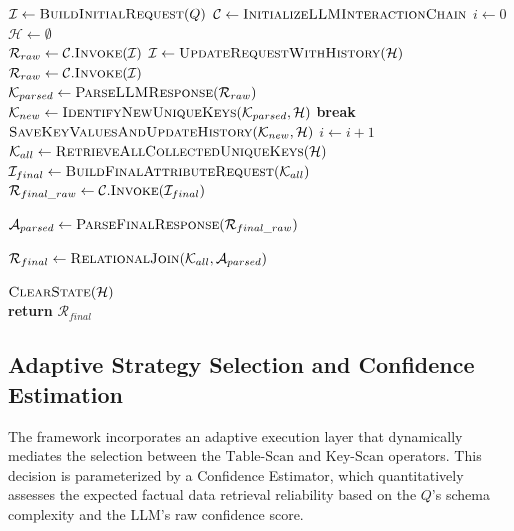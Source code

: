 \begin{algorithm}
\caption{Key-Scan Algorithm}
\label{alg:key_scan}
\begin{algorithmic}[1]
    \State $\mathcal{I} \gets \Call{BuildInitialRequest}{Q}$ 
    \State $\mathcal{C} \gets \Call{InitializeLLMInteractionChain}{}$
    \State $i \gets 0$
    \State $\mathcal{H} \gets \emptyset$ 
    \\
            \State $\mathcal{R}_{raw} \gets \mathcal{C}.\Call{Invoke}{\mathcal{I}}$
        \Else
            \State $\mathcal{I} \gets \Call{UpdateRequestWithHistory}{\mathcal{H}}$
            \State $\mathcal{R}_{raw} \gets \mathcal{C}.\Call{Invoke}{\mathcal{I}}$
        \EndIf
        \\
        \State $\mathcal{K}_{parsed} \gets \Call{ParseLLMResponse}{\mathcal{R}_{raw}}$ 
        \State $\mathcal{K}_{new} \gets \Call{IdentifyNewUniqueKeys}{\mathcal{K}_{parsed}, \mathcal{H}}$
            \State \textbf{break}
        \EndIf
        \\
        \State $\Call{SaveKeyValuesAndUpdateHistory}{\mathcal{K}_{new}, \mathcal{H}}$
        \State $i \gets i + 1$
    \EndWhile
    \\
    \State $\mathcal{K}_{all} \gets \Call{RetrieveAllCollectedUniqueKeys}{\mathcal{H}}$
    \State $\mathcal{I}_{final} \gets \Call{BuildFinalAttributeRequest}{\mathcal{K}_{all}}$ 
    \State $\mathcal{R}_{final\_raw} \gets \mathcal{C}.\Call{Invoke}{\mathcal{I}_{final}}$
    
    \State $\mathcal{A}_{parsed} \gets \Call{ParseFinalResponse}{\mathcal{R}_{final\_raw}}$ 
    
    \State $\mathcal{R}_{final} \gets \Call{RelationalJoin}{\mathcal{K}_{all}, \mathcal{A}_{parsed}}$ 
    
    \State $\Call{ClearState}{\mathcal{H}}$
    \\
    \State \textbf{return} $\mathcal{R}_{final}$
\EndFunction
\end{algorithmic}
\end{algorithm}

\newpage
\subsection{Adaptive Strategy Selection and Confidence Estimation}\label{subsec:conf_est}
The framework incorporates an adaptive execution layer that dynamically mediates the selection between the $\text{Table-Scan}$ and $\text{Key-Scan}$ operators. This decision is parameterized by a Confidence Estimator, which quantitatively assesses the expected factual data retrieval reliability based on the $Q$'s schema complexity and the LLM's raw confidence score.

